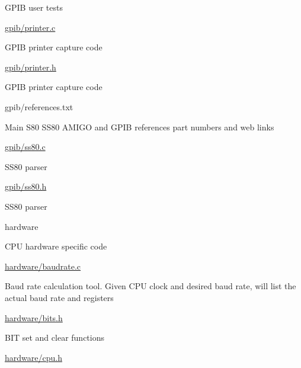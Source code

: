 \begin{DoxyItemize}
\begin{DoxyItemize}
\begin{DoxyItemize}
\item G\+P\+IB user tests
\end{DoxyItemize}
\item \hyperlink{printer_8c}{gpib/printer.\+c}
\begin{DoxyItemize}
\item G\+P\+IB printer capture code
\end{DoxyItemize}
\item \hyperlink{printer_8h}{gpib/printer.\+h}
\begin{DoxyItemize}
\item G\+P\+IB printer capture code
\end{DoxyItemize}
\item gpib/references.\+txt
\begin{DoxyItemize}
\item Main S80 S\+S80 A\+M\+I\+GO and G\+P\+IB references part numbers and web links
\end{DoxyItemize}
\item \hyperlink{ss80_8c}{gpib/ss80.\+c}
\begin{DoxyItemize}
\item S\+S80 parser
\end{DoxyItemize}
\item \hyperlink{ss80_8h}{gpib/ss80.\+h}
\begin{DoxyItemize}
\item S\+S80 parser
\end{DoxyItemize}
\end{DoxyItemize}
\item hardware
\begin{DoxyItemize}
\item C\+PU hardware specific code
\item \hyperlink{baudrate_8c}{hardware/baudrate.\+c}
\begin{DoxyItemize}
\item Baud rate calculation tool. Given C\+PU clock and desired baud rate, will list the actual baud rate and registers
\end{DoxyItemize}
\item \hyperlink{bits_8h}{hardware/bits.\+h}
\begin{DoxyItemize}
\item B\+IT set and clear functions
\end{DoxyItemize}
\item \hyperlink{cpu_8h}{hardware/cpu.\+h}
\begin{DoxyItemize}

\end{DoxyItemize}
\end{DoxyItemize}
\end{DoxyItemize}
